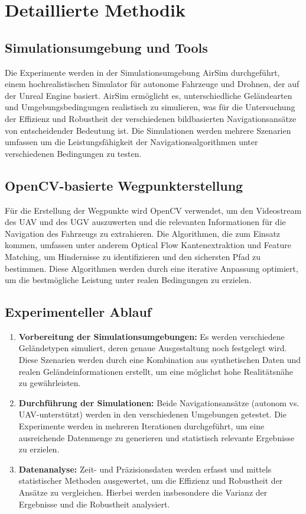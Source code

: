 \section{Detaillierte Methodik}

\subsection{Simulationsumgebung und Tools}

Die Experimente werden in der Simulationsumgebung \gls{AirSim} durchgeführt, einem hochrealistischen Simulator für autonome Fahrzeuge und Drohnen, der auf der \gls{Unreal Engine} basiert. 
\gls{AirSim} ermöglicht es, unterschiedliche Geländearten und Umgebungsbedingungen realistisch zu simulieren, was für die Untersuchung der Effizienz und Robustheit der verschiedenen bildbasierten Navigationsansätze von entscheidender Bedeutung ist. 
Die Simulationen werden mehrere Szenarien umfassen um die Leistungsfähigkeit der Navigationsalgorithmen unter verschiedenen Bedingungen zu testen.

\subsection{\gls{OpenCV}-basierte Wegpunkterstellung}

Für die Erstellung der Wegpunkte wird \gls{OpenCV} verwendet, um den Videostream des \ac{UAV} und des \ac{UGV} auszuwerten und die relevanten Informationen für die Navigation des Fahrzeugs zu extrahieren. 
Die Algorithmen, die zum Einsatz kommen, umfassen unter anderem Optical Flow Kantenextraktion und \gls{Feature Matching}, um Hindernisse zu identifizieren und den sichersten Pfad zu bestimmen. 
Diese Algorithmen werden durch eine iterative Anpassung optimiert, um die bestmögliche Leistung unter realen Bedingungen zu erzielen.

\subsection{Experimenteller Ablauf}

\begin{enumerate}
    \item \textbf{Vorbereitung der Simulationsumgebungen:} 
    Es werden verschiedene Geländetypen simuliert, deren genaue Ausgestaltung noch festgelegt wird. 
    Diese Szenarien werden durch eine Kombination aus synthetischen Daten und realen Geländeinformationen erstellt, um eine möglichst hohe Realitätsnähe zu gewährleisten.
    \item \textbf{Durchführung der Simulationen:} 
    Beide Navigationsansätze (autonom vs. \ac{UAV}-unterstützt) werden in den verschiedenen Umgebungen getestet. 
    Die Experimente werden in mehreren Iterationen durchgeführt, um eine ausreichende Datenmenge zu generieren und statistisch relevante Ergebnisse zu erzielen.
    \item \textbf{Datenanalyse:} 
    Zeit- und Präzisionsdaten werden erfasst und mittels statistischer Methoden ausgewertet, um die Effizienz und Robustheit der Ansätze zu vergleichen.  
    Hierbei werden insbesondere die Varianz der Ergebnisse und die Robustheit analysiert.
\end{enumerate}
